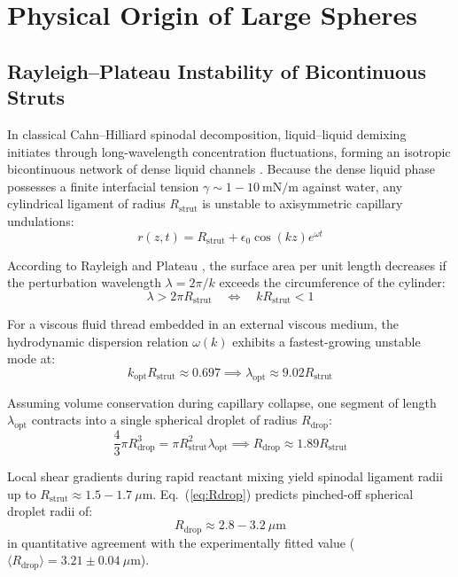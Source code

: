 \documentclass[11pt,a4paper]{article}
\begin{document}
\section{Physical Origin of Large Spheres}

\subsection{Rayleigh--Plateau Instability of Bicontinuous Struts}

In classical Cahn--Hilliard spinodal decomposition, liquid--liquid demixing initiates through long-wavelength concentration fluctuations, forming an isotropic bicontinuous network of dense liquid channels \cite{cahn1965phase}. Because the dense liquid phase possesses a finite interfacial tension $\gamma \sim 1 - 10\ \mathrm{mN/m}$ against water, any cylindrical ligament of radius $R_{\mathrm{strut}}$ is unstable to axisymmetric capillary undulations:
\begin{equation}
r(z, t) = R_{\mathrm{strut}} + \epsilon_0 \cos(k z) e^{\omega t}
\end{equation}

According to Rayleigh and Plateau \cite{plateau1873statique, rayleigh1878instability}, the surface area per unit length decreases if the perturbation wavelength $\lambda = 2\pi / k$ exceeds the circumference of the cylinder:
\begin{equation}
\lambda > 2\pi R_{\mathrm{strut}} \quad \iff \quad k R_{\mathrm{strut}} < 1
\end{equation}

For a viscous fluid thread embedded in an external viscous medium, the hydrodynamic dispersion relation $\omega(k)$ exhibits a fastest-growing unstable mode at:
\begin{equation}
k_{\mathrm{opt}} R_{\mathrm{strut}} \approx 0.697 \implies \lambda_{\mathrm{opt}} \approx 9.02 R_{\mathrm{strut}}
\end{equation}

Assuming volume conservation during capillary collapse, one segment of length $\lambda_{\mathrm{opt}}$ contracts into a single spherical droplet of radius $R_{\mathrm{drop}}$:
\begin{equation}
\frac{4}{3}\pi R_{\mathrm{drop}}^3 = \pi R_{\mathrm{strut}}^2 \lambda_{\mathrm{opt}} \implies R_{\mathrm{drop}} \approx 1.89 R_{\mathrm{strut}}
\label{eq:Rdrop}
\end{equation}

Local shear gradients during rapid reactant mixing yield spinodal ligament radii up to $R_{\mathrm{strut}} \approx 1.5 - 1.7\ \mu\mathrm{m}$. Eq.~(\ref{eq:Rdrop}) predicts pinched-off spherical droplet radii of:
\begin{equation}
R_{\mathrm{drop}} \approx 2.8 - 3.2\ \mu\mathrm{m}
\end{equation}
in quantitative agreement with the experimentally fitted value ($\langle R_{\mathrm{drop}} \rangle = 3.21 \pm 0.04\ \mu\mathrm{m}$).
\end{document}

